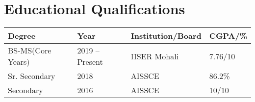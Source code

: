\section*{Educational Qualifications}
\begin{tabulary}{\textwidth}{L L L L}

\toprule
\textbf{Degree} & \textbf{Year} & \textbf{Institution/Board} & \textbf{CGPA/\%}\\
\midrule
BS-MS(Core Years) & 2019 -- Present & IISER Mohali & 7.76/10\\%
Sr. Secondary & 2018 & AISSCE & 86.2\%\\
Secondary & 2016 & AISSCE & 10/10\\
\bottomrule

\end{tabulary}
